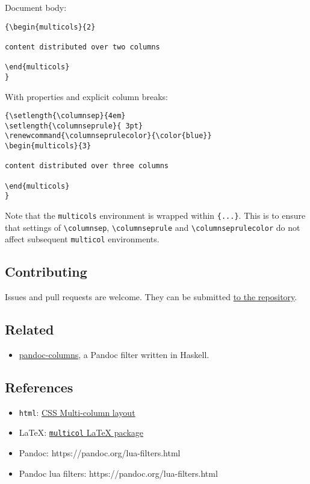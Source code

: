 \documentclass[
]{article}
\providecommand{\tightlist}{%
  \setlength{\itemsep}{0pt}\setlength{\parskip}{0pt}}
\begin{document}
Document body:

\begin{verbatim}
{\begin{multicols}{2}

content distributed over two columns

\end{multicols}
}
\end{verbatim}

With properties and explicit column breaks:

\begin{verbatim}
{\setlength{\columnsep}{4em}
\setlength{\columnseprule}{ 3pt}
\renewcommand{\columnseprulecolor}{\color{blue}}
\begin{multicols}{3}

content distributed over three columns

\end{multicols}
}
\end{verbatim}

Note that the \texttt{multicols} environment is wrapped within
\texttt{\{...\}}. This is to ensure that settings of
\texttt{\textbackslash{}columnsep},
\texttt{\textbackslash{}columnseprule} and
\texttt{\textbackslash{}columnseprulecolor} do not affect subsequent
\texttt{multicol} environments.

\hypertarget{contributing}{%
\subsection{Contributing}\label{contributing}}

Issues and pull requests are welcome. They can be submitted
\href{https://github.com/jdutant/columns}{to the repository}.

\hypertarget{related}{%
\subsection{Related}\label{related}}

\begin{itemize}
\tightlist
\item
  \href{https://github.com/mhwombat/pandoc-columns}{pandoc-columns}, a
  Pandoc filter written in Haskell.
\end{itemize}

\hypertarget{references}{%
\subsection{References}\label{references}}

\begin{itemize}
\tightlist
\item
  \texttt{html}: \href{https://drafts.csswg.org/css-multicol}{CSS
  Multi-column layout}
\item
  LaTeX: \href{https://www.ctan.org/pkg/multicol}{\texttt{multicol}
  LaTeX package}
\item
  Pandoc: https://pandoc.org/lua-filters.html
\item
  Pandoc lua filters: https://pandoc.org/lua-filters.html
\end{itemize}
\end{document}
